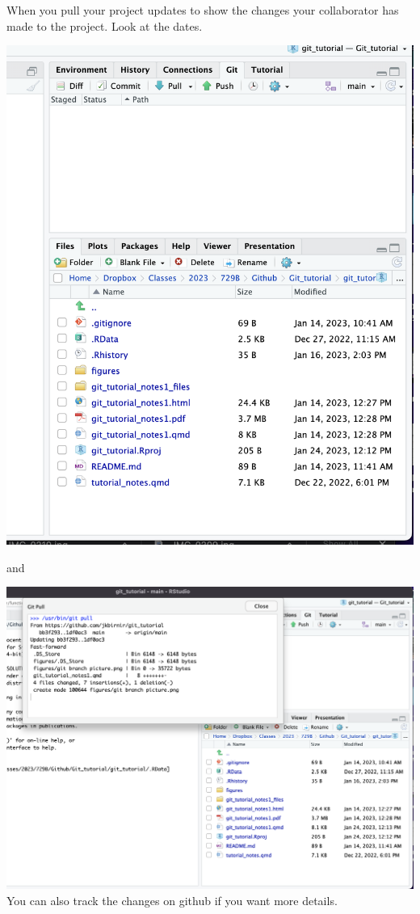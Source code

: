 \documentclass[
  letterpaper,
  DIV=11,
  numbers=noendperiod]{scrartcl}
\begin{document}
When you pull your project updates to show the changes your collaborator
has made to the project. Look at the dates.

\includegraphics{figures/18.png}

and

\includegraphics{figures/19.png} You can also track the changes on
github if you want more details.
\end{document}
